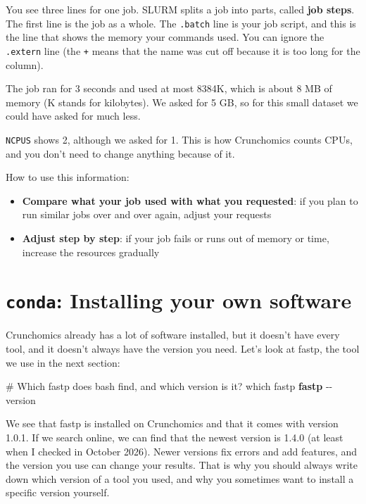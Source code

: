 \documentclass[
  letterpaper,
  DIV=11,
  numbers=noendperiod]{scrreprt}
\newenvironment{Shaded}{}{}
\newcommand{\AttributeTok}[1]{\textcolor[rgb]{0.84,0.23,0.29}{#1}}
\newcommand{\CommentTok}[1]{\textcolor[rgb]{0.42,0.45,0.49}{#1}}
\newcommand{\ExtensionTok}[1]{\textcolor[rgb]{0.84,0.23,0.29}{\textbf{#1}}}
\newcommand{\FunctionTok}[1]{\textcolor[rgb]{0.44,0.26,0.76}{#1}}
\newcommand{\NormalTok}[1]{\textcolor[rgb]{0.14,0.16,0.18}{#1}}
\providecommand{\tightlist}{%
  \setlength{\itemsep}{0pt}\setlength{\parskip}{0pt}}
\begin{document}
\begin{tcolorbox}
You see three lines for one job. SLURM splits a job into parts, called
\textbf{job steps}. The first line is the job as a whole. The
\texttt{.batch} line is your job script, and this is the line that shows
the memory your commands used. You can ignore the \texttt{.extern} line
(the \texttt{+} means that the name was cut off because it is too long
for the column).

The job ran for 3 seconds and used at most 8384K, which is about 8 MB of
memory (K stands for kilobytes). We asked for 5 GB, so for this small
dataset we could have asked for much less.

\texttt{NCPUS} shows 2, although we asked for 1. This is how Crunchomics
counts CPUs, and you don't need to change anything because of it.

How to use this information:

\begin{itemize}
\tightlist
\item
  \textbf{Compare what your job used with what you requested}: if you
  plan to run similar jobs over and over again, adjust your requests
\item
  \textbf{Adjust step by step}: if your job fails or runs out of memory
  or time, increase the resources gradually
\end{itemize}

\end{tcolorbox}

\section{\texorpdfstring{\texttt{conda}: Installing your own
software}{conda: Installing your own software}}\label{conda-installing-your-own-software}

Crunchomics already has a lot of software installed, but it doesn't have
every tool, and it doesn't always have the version you need. Let's look
at fastp, the tool we use in the next section:

\begin{Shaded}
\begin{Highlighting}[]
\CommentTok{\# Which fastp does bash find, and which version is it?}
\FunctionTok{which}\NormalTok{ fastp}
\ExtensionTok{fastp} \AttributeTok{{-}{-}version}
\end{Highlighting}
\end{Shaded}

We see that fastp is installed on Crunchomics and that it comes with
version 1.0.1. If we search online, we can find that the newest version
is 1.4.0 (at least when I checked in October 2026). Newer versions fix
errors and add features, and the version you use can change your
results. That is why you should always write down which version of a
tool you used, and why you sometimes want to install a specific version
yourself.
\end{document}
